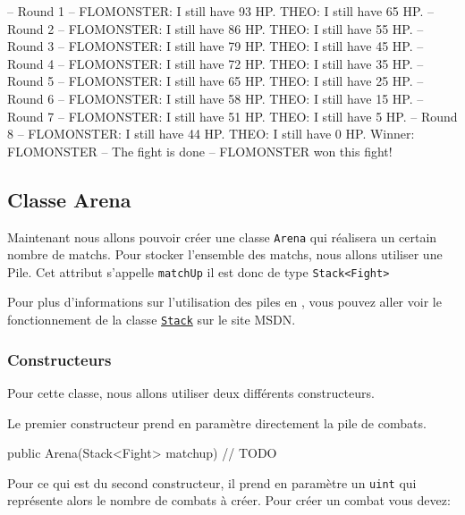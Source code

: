 \begin{shell}
-- Round 1 --
FLOMONSTER: I still have 93 HP.
THEO: I still have 65 HP.
-- Round 2 --
FLOMONSTER: I still have 86 HP.
THEO: I still have 55 HP.
-- Round 3 --
FLOMONSTER: I still have 79 HP.
THEO: I still have 45 HP.
-- Round 4 --
FLOMONSTER: I still have 72 HP.
THEO: I still have 35 HP.
-- Round 5 --
FLOMONSTER: I still have 65 HP.
THEO: I still have 25 HP.
-- Round 6 --
FLOMONSTER: I still have 58 HP.
THEO: I still have 15 HP.
-- Round 7 --
FLOMONSTER: I still have 51 HP.
THEO: I still have 5 HP.
-- Round 8 --
FLOMONSTER: I still have 44 HP.
THEO: I still have 0 HP.
Winner: FLOMONSTER
-- The fight is done --
FLOMONSTER won this fight!
\end{shell}

\subsection{Classe Arena}

Maintenant nous allons pouvoir créer une classe \texttt{Arena} qui réalisera un certain nombre de matchs. Pour stocker l'ensemble des matchs, nous allons utiliser une Pile. Cet attribut s'appelle \texttt{matchUp} il est donc de type \texttt{Stack<Fight>}\\

\begin{hint}
Pour plus d'informations sur l'utilisation des piles en \csharp, vous pouvez aller voir le fonctionnement de la classe \href{https://msdn.microsoft.com/fr-fr/library/system.collections.stack(v=vs.110).aspx}{\texttt{Stack}} sur le site MSDN.
\end{hint}

\subsubsection{Constructeurs}

Pour cette classe, nous allons utiliser deux différents constructeurs. 

Le premier constructeur prend en paramètre directement la pile de combats.\\

\begin{code}
public Arena(Stack<Fight> matchup)
{
	// TODO
}
\end{code}

Pour ce qui est du second constructeur, il prend en paramètre un \texttt{uint} qui représente alors le nombre de combats à créer. Pour créer un combat vous devez:

